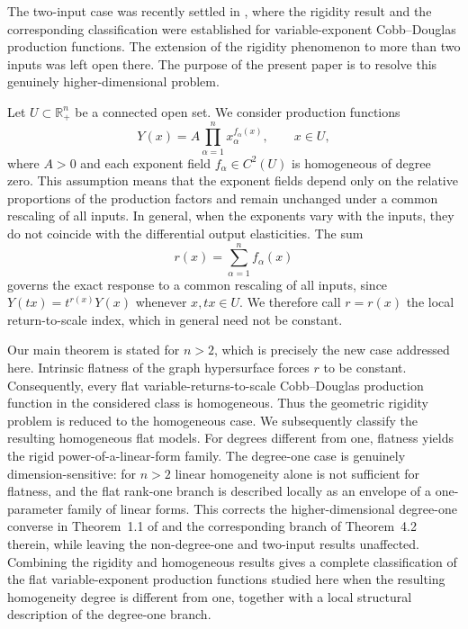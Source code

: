 \documentclass[12pt]{amsart}
\begin{document}
The two-input case was recently settled in \cite{Previous2D}, where the rigidity result and the corresponding classification were established for variable-exponent Cobb--Douglas production functions. The extension of the rigidity phenomenon to more than two inputs was left open there. The purpose of the present paper is to resolve this genuinely higher-dimensional problem.

Let $U\subset\mathbb{R}_+^n$ be a connected open set. We consider
production functions
\[
Y(x)
=
A\prod_{\alpha=1}^{n}x_{\alpha}^{f_{\alpha}(x)},
\qquad x\in U,
\]
where $A>0$ and each exponent field
$f_{\alpha}\in C^{2}(U)$ is homogeneous of degree zero. This assumption means that the exponent fields depend only on the relative proportions of the production
factors and remain unchanged under a common rescaling of all inputs. In general, when the exponents vary with the inputs, they do not coincide with the differential output elasticities. The sum
\[
r(x)
=
\sum_{\alpha=1}^{n}f_{\alpha}(x)
\]
governs the exact response to a common rescaling of all inputs, since $Y(tx)=t^{r(x)}Y(x)$ whenever $x,tx\in U$. We therefore call $r=r(x)$ the local return-to-scale index, which in general need not be constant.

Our main theorem is stated for $n>2$, which is precisely the new case
addressed here. Intrinsic flatness of the graph hypersurface forces $r$ to be constant. Consequently, every flat
variable-returns-to-scale Cobb--Douglas production function in the
considered class is homogeneous. Thus the geometric rigidity problem is reduced to the homogeneous case. We subsequently classify the resulting homogeneous flat models. For degrees different from one, flatness yields the rigid power-of-a-linear-form family. The degree-one case is genuinely dimension-sensitive: for $n>2$ linear homogeneity alone is not sufficient for flatness, and the flat rank-one branch is described locally as an envelope of a one-parameter family of linear forms. This corrects the higher-dimensional degree-one converse in Theorem~1.1 of \cite{CV2013} and the corresponding branch of Theorem~4.2 therein, while leaving the non-degree-one and two-input results unaffected. Combining the rigidity and homogeneous results gives a complete classification of the flat variable-exponent production functions studied here when the resulting homogeneity degree is different from one, together with a local structural description of the degree-one branch.
\end{document}
